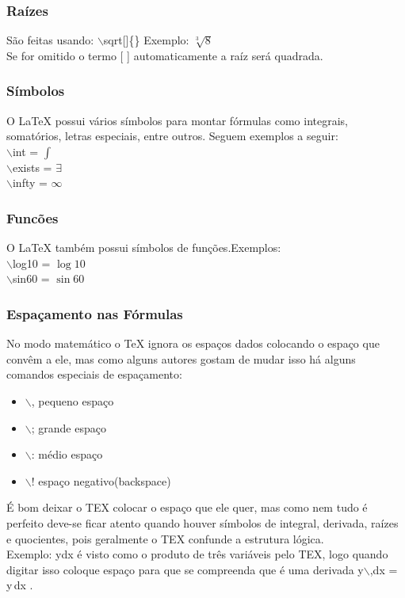 \documentclass[12pt]{article}
\begin{document}
			\subsubsection{Raízes}
				São feitas usando:  $\backslash$sqrt[]\{{}\} Exemplo: $\sqrt[3]{8}$ \\
				Se for omitido o termo [ ] automaticamente a raíz será quadrada.
				
			\subsubsection{Símbolos}
				O LaTeX possui vários símbolos para montar fórmulas como integrais, somatórios, letras especiais, entre outros. Seguem exemplos a seguir:\\
				$\backslash$int = $\int$\\
				$\backslash$exists = $\exists$ \\
				$\backslash$infty = $\infty$
			
			\subsubsection{Funcões}
				O LaTeX também possui símbolos de funções.Exemplos:\\
				$\backslash$log10 = $\log10$ \\
				$\backslash$sin60 = $\sin60$
			
			\subsubsection{Espaçamento nas Fórmulas}
				No modo matemático o TeX ignora os espaços dados colocando o espaço que convêm a ele, mas como alguns autores gostam de mudar isso há alguns comandos especiais de espaçamento:
				\begin{itemize}
					\item $\backslash$, pequeno espaço 
					\item $\backslash$; grande espaço 
					\item $\backslash$: médio espaço 
					\item $\backslash$! espaço negativo(backspace) 
				\end{itemize}
				É bom deixar o TEX colocar o espaço que ele quer, mas como nem tudo é perfeito deve-se ficar atento quando houver símbolos de integral, derivada, raízes e quocientes, pois geralmente o TEX confunde a estrutura lógica. \\
				Exemplo: ydx é visto como o produto de três variáveis pelo TEX, logo quando digitar isso coloque espaço para que se compreenda que é uma derivada  y$\backslash$,dx = y\,dx .
		
\end{document}
